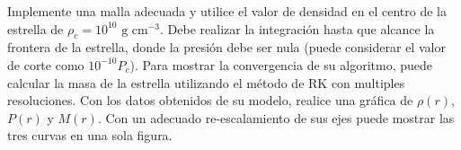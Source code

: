 \documentclass[11pt]{article}
\begin{document}
Implemente una malla adecuada y utilice el valor de densidad en el centro de la estrella de $\rho_c = 10^{10} \textrm{ g cm}^{-3}$. Debe realizar la integración hasta que alcance la frontera de la estrella, donde la presión debe ser nula (puede considerar el valor de corte como $10^{-10} P_c$). Para mostrar la convergencia de su algoritmo, puede calcular la masa de la estrella utilizando el método de RK con multiples resoluciones.
Con los datos obtenidos de su modelo, realice una gráfica de $\rho(r)$, $P(r)$ y $M(r)$. Con un adecuado re-escalamiento de sus ejes puede mostrar las tres curvas en una sola figura.



\end{document}
